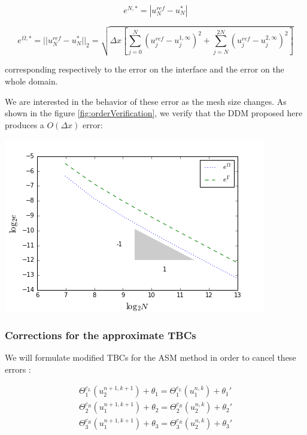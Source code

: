 \begin{equation*}
	e^{N,*} = |u^{ref}_N - u^{*}_N|
\end{equation*}

\begin{equation}
	\label{eq:errorDDM}
	e^{\Omega,*} = ||u^{ref}_N - u^{*}_N||_2 = \sqrt{\Delta x \left[ \sum_{j=0}^N{(u^{ref}_j - u^{1,\infty}_j)^2 } + \sum_{j=N}^{2N}{(u^{ref}_j - u^{2,\infty}_j)^2 } \right] }
\end{equation}

\noindent corresponding respectively to the error on the interface and the error on the whole domain.

\indent We are interested in the behavior of these error as the mesh size changes. As shown in the figure \ref{fig:orderVerification}, we verify that the DDM proposed here produces a $O(\Delta x)$ error:

\begingroup
\begin{center}
	\includegraphics[scale=.5]{figures/convergenceVerificationCorrectN.png}
\end{center}
\endgroup

\subsubsection{Corrections for the approximate TBCs}

\indent We will formulate modified TBCs for the ASM method in order to cancel these errors :

\begin{equation*}
    \begin{gathered}
        \Theta_1^{c_L}(u_2^{n+1,k+1}) + \theta_1 = \Theta_1^{c_L}(u_1^{n,k}) + \theta_1' \\
        \Theta_2^{c_R}(u_1^{n+1,k+1}) + \theta_2 = \Theta_2^{c_R}(u_2^{n,k}) + \theta_2' \\
        \Theta_3^{c_R}(u_1^{n+1,k+1}) + \theta_3 = \Theta_3^{c_R}(u_2^{n,k}) + \theta_3'
    \end{gathered}
\end{equation*}


